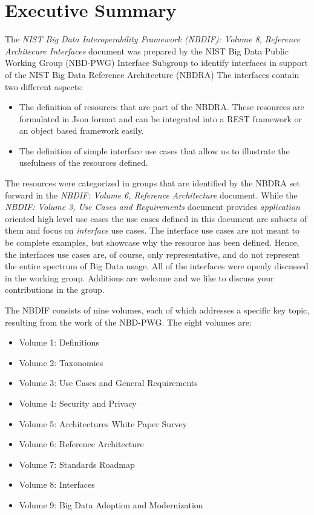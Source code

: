 \section*{Executive Summary}

The {\it NIST Big Data Interoperability Framework (NBDIF): Volume 8, Reference Architecure Interfaces} document
\cite{nist-vol-8} was prepared by the NIST Big Data Public Working
Group (NBD-PWG) Interface Subgroup to identify interfaces in support
of the NIST Big Data Reference Architecture (NBDRA) The interfaces
contain two different aspects:

\begin{itemize}

\item The definition of resources that are part of the NBDRA. These
  resources are formulated in Json format and can be integrated into a
  REST framework or an object based framework easily.

\item The definition of simple interface use cases that allow us to
  illustrate the usefulness of the resources defined.

\end{itemize} 

The resources were categorized in groups that are identified by the
NBDRA set forward in the {\it NBDIF: Volume 6, Reference Architecture} document. While 
the {\it NBDIF: Volume 3, Use Cases and Requirements} document provides {\it
  application} oriented high level use cases the use cases defined in
this document are subsets of them and focus on {\it interface} use
cases. The interface use cases are not meant to be complete examples,
but showcase why the resource has been defined. Hence, the interfaces
use cases are, of course, only representative, and do not represent
the entire spectrum of Big Data usage. All of the interfaces were
openly discussed in the working group. Additions are welcome and we
like to discuss your contributions in the group.

The NBDIF consists of nine
volumes, each of which addresses a specific key topic, resulting from
the work of the NBD-PWG. The eight volumes are:

\begin{itemize}
\item Volume 1: Definitions
\item Volume 2: Taxonomies
\item Volume 3: Use Cases and General Requirements
\item Volume 4: Security and Privacy
\item Volume 5: Architectures White Paper Survey
\item Volume 6: Reference Architecture
\item Volume 7: Standards Roadmap
\item Volume 8: Interfaces
\item Volume 9: Big Data Adoption and Modernization
\end{itemize}

